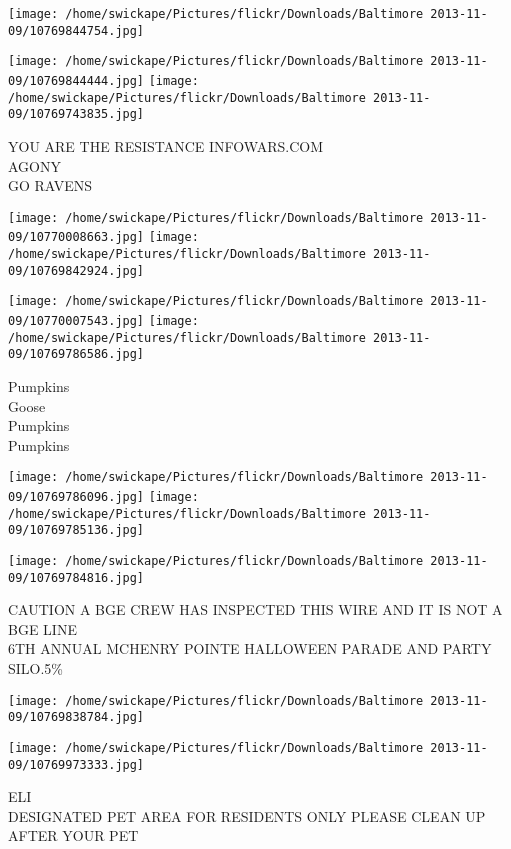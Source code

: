 \documentclass[10pt,letterpaper]{article}
\begin{document}
\texttt{[image: /home/swickape/Pictures/flickr/Downloads/Baltimore 2013-11-09/10769844754.jpg]}

\vspace{0.25in}
\texttt{[image: /home/swickape/Pictures/flickr/Downloads/Baltimore 2013-11-09/10769844444.jpg]}
\texttt{[image: /home/swickape/Pictures/flickr/Downloads/Baltimore 2013-11-09/10769743835.jpg]}

YOU ARE THE RESISTANCE INFOWARS.COM\\
AGONY\\
GO RAVENS
\pagebreak

\texttt{[image: /home/swickape/Pictures/flickr/Downloads/Baltimore 2013-11-09/10770008663.jpg]}
\texttt{[image: /home/swickape/Pictures/flickr/Downloads/Baltimore 2013-11-09/10769842924.jpg]}

\texttt{[image: /home/swickape/Pictures/flickr/Downloads/Baltimore 2013-11-09/10770007543.jpg]}
\texttt{[image: /home/swickape/Pictures/flickr/Downloads/Baltimore 2013-11-09/10769786586.jpg]}

Pumpkins\\
Goose\\
Pumpkins\\
Pumpkins
\pagebreak

\texttt{[image: /home/swickape/Pictures/flickr/Downloads/Baltimore 2013-11-09/10769786096.jpg]}
\texttt{[image: /home/swickape/Pictures/flickr/Downloads/Baltimore 2013-11-09/10769785136.jpg]}

\vspace{0.25in}
\texttt{[image: /home/swickape/Pictures/flickr/Downloads/Baltimore 2013-11-09/10769784816.jpg]}

CAUTION A BGE CREW HAS INSPECTED THIS WIRE AND IT IS NOT A BGE LINE\\
6TH ANNUAL MCHENRY POINTE HALLOWEEN PARADE AND PARTY\\
SILO.5\%
\pagebreak

\texttt{[image: /home/swickape/Pictures/flickr/Downloads/Baltimore 2013-11-09/10769838784.jpg]}

\vspace{0.25in}
\texttt{[image: /home/swickape/Pictures/flickr/Downloads/Baltimore 2013-11-09/10769973333.jpg]}

ELI\\
DESIGNATED PET AREA FOR RESIDENTS ONLY PLEASE CLEAN UP AFTER YOUR PET
\pagebreak
\end{document}
